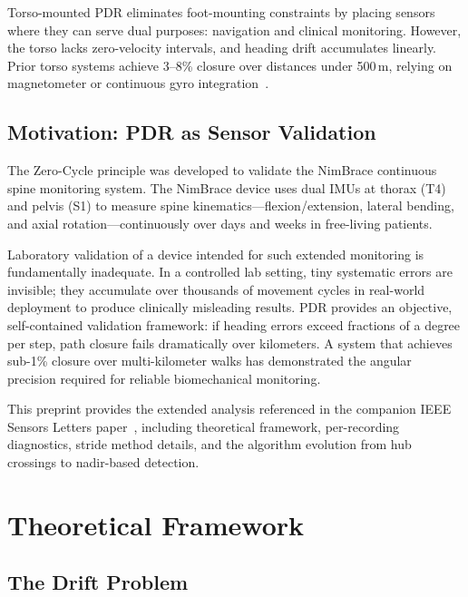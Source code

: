 \documentclass[11pt,a4paper]{article}
\begin{document}
Torso-mounted PDR eliminates foot-mounting constraints by placing sensors where
they can serve dual purposes: navigation and clinical monitoring. However, the
torso lacks zero-velocity intervals, and heading drift accumulates linearly.
Prior torso systems achieve 3--8\% closure over distances under 500\,m,
relying on magnetometer or continuous gyro
integration~\cite{beauregard2006,jimenez2009}.

\subsection{Motivation: PDR as Sensor Validation}

The Zero-Cycle principle was developed to validate the NimBrace continuous
spine monitoring system. The NimBrace device uses dual IMUs at thorax (T4) and
pelvis (S1) to measure spine kinematics---flexion/extension, lateral bending,
and axial rotation---continuously over days and weeks in free-living patients.

Laboratory validation of a device intended for such extended monitoring is
fundamentally inadequate. In a controlled lab setting, tiny systematic errors
are invisible; they accumulate over thousands of movement cycles in real-world
deployment to produce clinically misleading results. PDR provides an objective,
self-contained validation framework: if heading errors exceed fractions of a
degree per step, path closure fails dramatically over kilometers. A system that
achieves sub-1\% closure over multi-kilometer walks has demonstrated the
angular precision required for reliable biomechanical monitoring.

This preprint provides the extended analysis referenced in the companion IEEE
Sensors Letters paper~\cite{miekisiak2026letter}, including theoretical
framework, per-recording diagnostics, stride method details, and the algorithm
evolution from hub crossings to nadir-based detection.

\section{Theoretical Framework}
\label{sec:theory}

\subsection{The Drift Problem}
\end{document}
